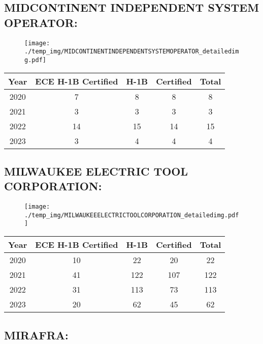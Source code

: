 \documentclass{article}%
\begin{document}
%
\newpage%
\subsection{MIDCONTINENT INDEPENDENT SYSTEM OPERATOR:}%
\label{subsec:MIDCONTINENTINDEPENDENTSYSTEMOPERATOR}%
\label{MIDCONTINENTINDEPENDENTSYSTEMOPERATORdetailed}%


\begin{figure}[htbp]%
\centering%
\texttt{[image: ./temp\_img/MIDCONTINENTINDEPENDENTSYSTEMOPERATOR\_detailedimg.pdf]}%
\end{figure}

%
\begin{longtable}{c|c|c|c|c}%
\hline%
Year&ECE H{-}1B Certified&H{-}1B&Certified&Total\\%
\hline%
2020&7&8&8&8\\%
\hline%
2021&3&3&3&3\\%
\hline%
2022&14&15&14&15\\%
\hline%
2023&3&4&4&4\\%
\hline%
\end{longtable}

%
\newpage%
\subsection{MILWAUKEE ELECTRIC TOOL CORPORATION:}%
\label{subsec:MILWAUKEEELECTRICTOOLCORPORATION}%
\label{MILWAUKEEELECTRICTOOLCORPORATIONdetailed}%


\begin{figure}[htbp]%
\centering%
\texttt{[image: ./temp\_img/MILWAUKEEELECTRICTOOLCORPORATION\_detailedimg.pdf]}%
\end{figure}

%
\begin{longtable}{c|c|c|c|c}%
\hline%
Year&ECE H{-}1B Certified&H{-}1B&Certified&Total\\%
\hline%
2020&10&22&20&22\\%
\hline%
2021&41&122&107&122\\%
\hline%
2022&31&113&73&113\\%
\hline%
2023&20&62&45&62\\%
\hline%
\end{longtable}

%
\newpage%
\subsection{MIRAFRA:}%
\label{subsec:MIRAFRA}%
\label{MIRAFRAdetailed}%
\end{document}

